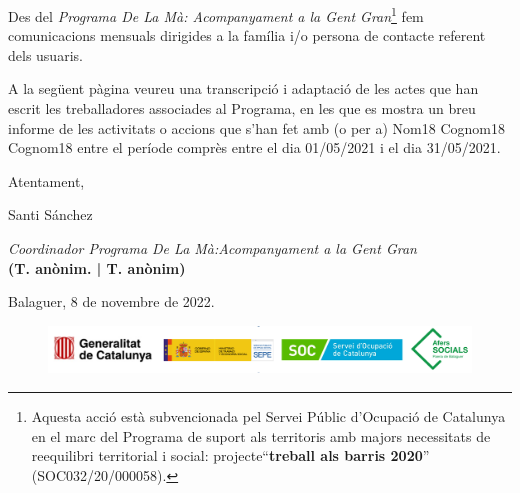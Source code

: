 \documentclass[a4paper,12pt]{elsarticle}  %
\begin{document}
Des del \textit{Programa De La Mà: Acompanyament a la Gent Gran}\footnote{Aquesta acció està subvencionada pel Servei Públic 
d'Ocupació de Catalunya en el marc del Programa de suport als territoris amb majors 
necessitats de reequilibri territorial i social: projecte``\textbf{treball als barris 2020}'' (SOC032/20/000058).} fem comunicacions mensuals
dirigides a la família i/o persona de contacte referent dels usuaris.


A la següent pàgina veureu una transcripció i adaptació de les actes que han escrit les treballadores associades
al Programa, en les que es mostra un breu informe de les activitats o accions que s'han fet amb (o per a) 
Nom18 Cognom18 Cognom18 entre el període comprès entre el dia 01/05/2021 i el dia 31/05/2021.

	\vspace{0.5cm}

\noindent Atentament,

\noindent Santi Sánchez

\noindent \textit{Coordinador Programa De La Mà:Acompanyament a la Gent Gran}\\
\textbf{(T. anònim. | T. anònim)}

	\vspace{0.5cm}

\noindent Balaguer, 8 de novembre de 2022.

	









\vfill

\FloatBarrier
\begin{figure}[h]
	\centering	
	\includegraphics[width=1\textwidth]{../IMATGES/logosGeneMinisterAferssocialsSoc.png}	
\end{figure}
\FloatBarrier	










\clearpage
\end{document}
